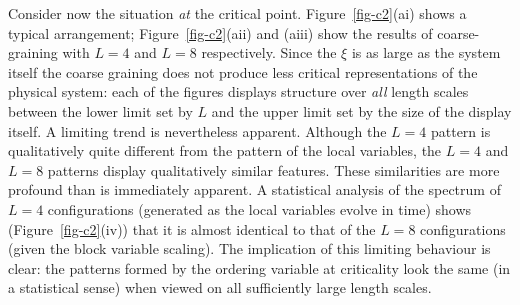 \documentclass[
  letterpaper,
  enabledeprecatedfontcommands]{report}
\begin{document}
Consider now the situation \emph{at} the critical point.
Figure~\ref{fig-c2}(ai) shows a typical arrangement;
Figure~\ref{fig-c2}(aii) and (aiii) show the results of coarse-graining
with \(L=4\) and \(L=8\) respectively. Since the \(\xi\) is as large as
the system itself the coarse graining does not produce less critical
representations of the physical system: each of the figures displays
structure over \emph{all} length scales between the lower limit set by
\(L\) and the upper limit set by the size of the display itself. A
limiting trend is nevertheless apparent. Although the \(L=4\) pattern is
qualitatively quite different from the pattern of the local variables,
the \(L=4\) and \(L=8\) patterns display qualitatively similar features.
These similarities are more profound than is immediately apparent. A
statistical analysis of the spectrum of \(L=4\) configurations
(generated as the local variables evolve in time) shows
(Figure~\ref{fig-c2}(iv)) that it is almost identical to that of the
\(L=8\) configurations (given the block variable scaling). The
implication of this limiting behaviour is clear: the patterns formed by
the ordering variable at criticality look the same (in a statistical
sense) when viewed on all sufficiently large length scales.
\end{document}

